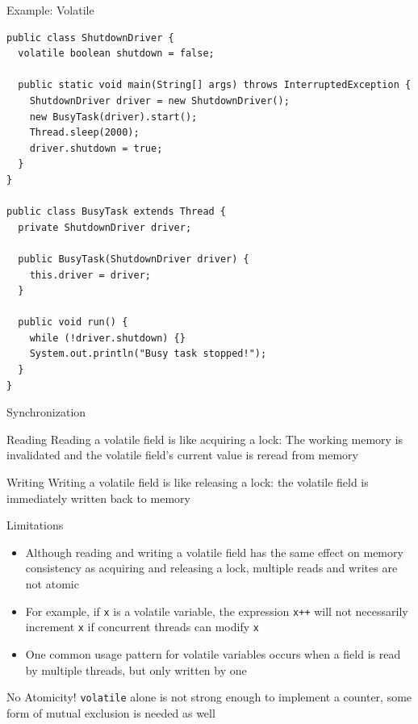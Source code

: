 \begin{frame}[fragile]{Example: Volatile}
\begin{lstlisting}[basicstyle=\fontsize{7}{9}\selectfont\ttfamily]
public class ShutdownDriver {
  volatile boolean shutdown = false;

  public static void main(String[] args) throws InterruptedException {
    ShutdownDriver driver = new ShutdownDriver();
    new BusyTask(driver).start();
    Thread.sleep(2000);
    driver.shutdown = true;
  }
}

public class BusyTask extends Thread {
  private ShutdownDriver driver;

  public BusyTask(ShutdownDriver driver) {
    this.driver = driver;
  }

  public void run() {
    while (!driver.shutdown) {}
    System.out.println("Busy task stopped!");
  }
}
\end{lstlisting}
\end{frame}

\begin{frame}{Synchronization}
  \begin{block}{Reading}
    Reading a volatile field is like acquiring a lock: The working
    memory is invalidated and the volatile field’s current value is
    reread from memory
  \end{block}


  \begin{block}{Writing}
    Writing a volatile field is like releasing a lock: the volatile
    field is immediately written back to memory
  \end{block}
\end{frame}

\begin{frame}{Limitations}
  \begin{itemize}
  \item Although reading and writing a volatile field has the same
    effect on memory consistency as acquiring and releasing a lock,
    multiple reads and writes are not atomic
  \item For example, if \lstinline!x! is a volatile variable, the
    expression \lstinline!x++!  will not necessarily increment
    \lstinline!x! if concurrent threads can modify \lstinline!x!
  \item One common usage pattern for volatile variables occurs when a
    field is read by multiple threads, but only written by one
  \end{itemize}


  \begin{alertblock}{No Atomicity!}
    \lstinline!volatile! alone is not strong enough to implement a
    counter, some form of mutual exclusion is needed as well
  \end{alertblock}
\end{frame}


